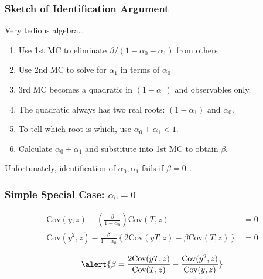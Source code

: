 \documentclass{beamer}
\begin{document}
\begin{frame}
  \frametitle{Sketch of Identification Argument}
  \alert{Very tedious algebra\ldots}
  \begin{enumerate}
    \item Use 1st MC to eliminate $\beta/(1 - \alpha_0 - \alpha_1)$ from others
    \item Use 2nd MC to solve for $\alpha_1$ in terms of $\alpha_0$ 
    \item 3rd MC becomes a quadratic in $(1-\alpha_1)$ and observables only.
    \item The quadratic always has two real roots: $(1 - \alpha_1)$ and $\alpha_0$.
    \item To tell which root is which, use $\alpha_0 + \alpha_1 < 1$.
    \item Calculate $\alpha_0 + \alpha_1$ and substitute into 1st MC to obtain $\beta$.
  \end{enumerate}

  \vspace{1em}
  \alert{Unfortunately, identification of $\alpha_0, \alpha_1$ fails if $\beta = 0$\ldots}
\end{frame}
\begin{frame}
  \frametitle{Simple Special Case: $\alpha_0 = 0$}
  \begin{align*}
    \mbox{Cov}(y,z) - \left( \frac{\beta}{1 - \alpha_0} \right) \mbox{Cov}(T,z) &= 0\\
  \mbox{Cov}(y^2,z) - \frac{\beta}{1 - \alpha_0}\left\{2\mbox{Cov}(yT,z)- \beta \mbox{Cov}(T,z)\right\} &= 0
  \end{align*}

  \vspace{1em}
  \[
    \alert{\beta = \frac{2\mbox{Cov}(yT,z)}{\mbox{Cov}(T,z)} - \frac{\mbox{Cov}(y^2,z)}{\mbox{Cov}(y,z)}}
  \]

\end{frame}
\end{document}
